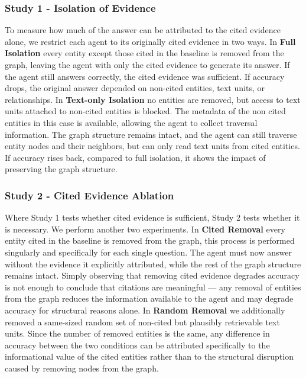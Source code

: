 \documentclass[
]{ceurart}
\begin{document}
\subsubsection*{Study 1 - Isolation of Evidence}

To measure how much of the answer can be attributed to the cited evidence alone, we restrict each agent to its originally cited evidence in two ways.
In \textbf{Full Isolation} every entity except those cited in the baseline is removed from the graph, leaving the agent with only the cited evidence to generate its answer. If the agent still answers correctly, the cited evidence was sufficient. If accuracy drops, the original answer depended on non-cited entities, text units, or relationships. In \textbf{Text-only Isolation} no entities are removed, but access to text units attached to non-cited entities is blocked. The metadata of the non cited entities in this case is available, allowing the agent to collect traversal information. The graph structure remains intact, and the agent can still traverse entity nodes and their neighbors, but can only read text units from cited entities. If accuracy rises back, compared to full isolation, it shows the impact of preserving the graph structure.

\subsubsection*{Study 2 - Cited Evidence Ablation}

Where Study 1 tests whether cited evidence is sufficient, Study 2 tests whether it is necessary. We perform another two experiments. In \textbf{Cited Removal} every entity cited in the baseline is removed from the graph, this process is performed singularly and specifically for each single question. The agent must now answer without the evidence it explicitly attributed, while the rest of the graph structure remains intact. Simply observing that removing cited evidence degrades accuracy is not enough to conclude that citations are meaningful — any removal of entities from the graph reduces the information available to the agent and may degrade accuracy for structural reasons alone. In \textbf{Random Removal} we additionally removed a same-sized random set of non-cited but plausibly retrievable text units. Since the number of removed entities is the same, any difference in accuracy between the two conditions can be attributed specifically to the informational value of the cited entities rather than to the structural disruption caused by removing nodes from the graph.
\end{document}
